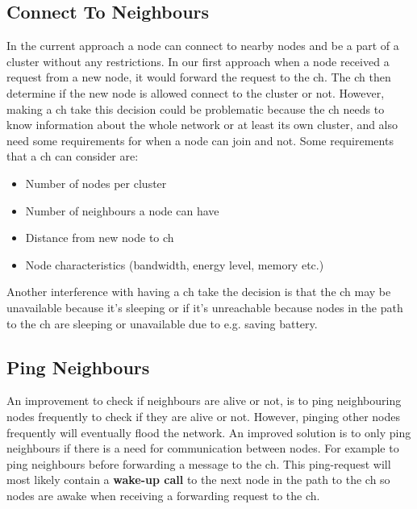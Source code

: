 \documentclass[USenglish]{uit-thesis}
\begin{document}
\subsection{Connect To Neighbours} \label{disc:conn_neighbours}


In the current approach a node can connect to nearby nodes and be a part of a cluster without any restrictions. In our first approach when a node received a request from a new node, it would forward the request to the \gls{ch}. The \gls{ch} then determine if the new node is allowed connect to the cluster or not. However, making a \gls{ch} take this decision could be problematic because the \gls{ch} needs to know information about the whole network or at least its own cluster, and also need some requirements for when a node can join and not. Some requirements that a \gls{ch} can consider are:

\begin{itemize}
\item Number of nodes per cluster
\item Number of neighbours a node can have
\item Distance from new node to \gls{ch}
\item Node characteristics (bandwidth, energy level, memory etc.)
\end{itemize}

Another interference with having a \gls{ch} take the decision is that the \gls{ch} may be unavailable because it's sleeping or if it's unreachable because nodes in the path to the \gls{ch} are sleeping or unavailable due to e.g. saving battery. 

\subsection{Ping Neighbours}
An improvement to check if neighbours are alive or not, is to ping neighbouring nodes frequently to check if they are alive or not. However, pinging other nodes frequently will eventually flood the network. An improved solution is to only ping neighbours if there is a need for communication between nodes. For example to ping neighbours before forwarding a message to the \gls{ch}. This ping-request will most likely contain a \textbf{wake-up call} to the next node in the path to the \gls{ch} so nodes are awake when receiving a forwarding request to the \gls{ch}.
\end{document}
